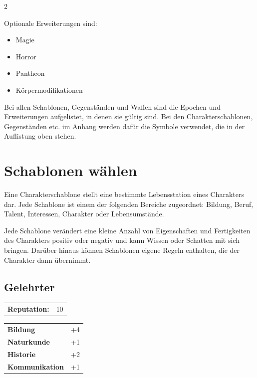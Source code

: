 \begin{multicols}{2}
{Optionale Erweiterungen sind:

\begin{itemize}
    \item Magie 
    \item Horror 
    \item Pantheon 
    \item Körpermodifikationen 
\end{itemize}

Bei allen Schablonen, Gegenständen und Waffen sind die Epochen und Erweiterungen aufgelistet, in denen sie gültig sind. Bei den Charakterschablonen, Gegenständen etc. im Anhang werden dafür die Symbole verwendet, die in der Auflistung oben stehen.
}{}


\section{Schablonen wählen}

Eine Charakterschablone stellt eine bestimmte Lebensstation eines Charakters dar. Jede Schablone ist einem der folgenden Bereiche zugeordnet: Bildung, Beruf, Talent, Interessen, Charakter oder Lebensumstände.

Jede Schablone verändert eine kleine Anzahl von Eigenschaften und Fertigkeiten des Charakters positiv oder negativ und kann Wissen oder Schatten mit sich bringen. Darüber hinaus können Schablonen eigene Regeln enthalten, die der Charakter dann übernimmt.

\begin{tcolorbox}
\subsection*{Gelehrter}
\tcblower
\begin{tabular}{@{}ll@{}}
    \textbf{Reputation:} & 10\\
\end{tabular}

\begin{tabular}{@{}ll@{}}
    \textbf{Bildung} & +4\\
    \textbf{Naturkunde} & +1\\
    \textbf{Historie} & +2\\
    \textbf{Kommunikation} & +1\\
\end{tabular}
\end{tcolorbox}


\end{multicols}
